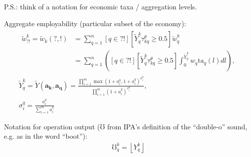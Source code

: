 \documentclass[hidelinks, nonatbib]{elsarticle}
\begin{document}
P.S.: think of a notation for economic taxa / aggregation levels.

Aggregate employability (particular subset of the economy):
\begin{gather}
    \begin{align}
        \tilde{w}_{?!}^{k} =
        \tilde{w}_{k}(?, !)
        &=
        \sum_{q=1}^{n}{
            [q \in ?!]
            [
                \tilde{Y}_{q}^{k}
                \ddot{\tau}_{kq}^{\theta}
                \geq 0.5
            ]
            \tilde{w}_{q}^{k}
        }
        \\
        &=
        \sum_{q=1}^{n}{
            \left(
                [q \in ?!]
                [
                \tilde{Y}_{q}^{k}
                \ddot{\tau}_{kq}^{\theta}
                \geq 0.5
                ]
                \int_{0}^{\tilde{Y}_{q}^{k}}{
                    w_q
                    \text{ta}_q(l)
                    dl
                }
            \right)
        }
        ,
    \end{align}
    \\
    \tilde{Y}_{q}^{k} = 
    \tilde{Y}(
        \boldsymbol{a_k},
        \boldsymbol{a_q}
        ) =
        \frac{
            \prod_{i=1}^{m}{
                {
                    \max(
                        1 + a_{i}^{k},
                        1 + a_{i}^{q}
                    )
                } ^ {
                    \sigma_{i}^{q}
                }
            }
        }{
            \prod_{i=1}^{m}{
                {
                    (
                        1 + a_{i}^{q}
                    )
                } ^ {
                    \sigma_{i}^{q}
                }
            }
        }
        ,\\
        \sigma_{i}^{q} = 
        \frac{
            a_{i}^{q}
        }{
            \sum_{i=1}^{m}{
                a_{i}^{q}
            }
        }
\end{gather}

Notation for operation output ($\mho$ from IPA's definition of the ``double-o'' sound, e.g. as in the word ``boot''):
\begin{gather}
    \mho_{q}^{k} = 
    \left\lfloor 
        {Y}_{q}^{k}
    \right\rfloor
\end{gather}
\end{document}
